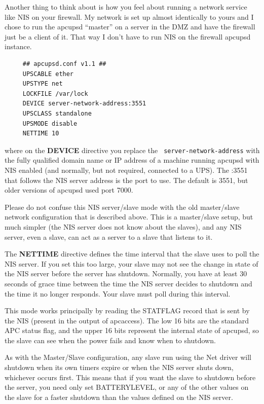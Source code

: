 {Another thing to think about is how you feel about running a network service
like NIS on your firewall. My network is set up almost identically to yours
and I chose to run the apcupsd ``master'' on a server in the DMZ and have the
firewall just be a client of it. That way I don't have to run NIS on the
firewall apcupsd instance. 

\footnotesize
\begin{verbatim}
     ## apcupsd.conf v1.1 ##
     UPSCABLE ether
     UPSTYPE net
     LOCKFILE /var/lock
     DEVICE server-network-address:3551
     UPSCLASS standalone
     UPSMODE disable
     NETTIME 10
\end{verbatim}
\normalsize

where on the {\bf DEVICE} directive you replace the {\tt
server-network-address} with the fully qualified domain name or IP address of
a machine running apcupsd with NIS enabled (and normally, but not required,
connected to a UPS). The :3551 that follows the NIS server address is the port
to use. The default is 3551, but older versions of apcupsd used port 7000.  

Please do not confuse this NIS server/slave mode with the old master/slave
network configuration that is described above.  This is a master/slave setup,
but much simpler (the NIS server does not know about the slaves), and any NIS
server, even a slave, can act as a server to a slave that listens to it.  

The {\bf NETTIME} directive defines the time interval that the slave uses to
poll the NIS server. If you set this too large, your slave may not see the
change in state of the NIS server before the server has shutdown. Normally,
you have at least 30 seconds of grace time between the time the NIS server
decides to shutdown and the time it no longer responds. Your slave must poll
during this interval.  

This mode works principally by reading the STATFLAG record that is sent by the
NIS (present in the output of apcaccess). The low 16 bits are the standard APC
status flag, and the upper 16 bits represent the internal state of apcupsd, so
the slave can see when the power fails and know when to shutdown.  

As with the Master/Slave configuration, any slave run using the Net driver
will shutdown when its own timers expire or when the NIS server shuts down,
whichever occurs first. This means that if you want the slave to shutdown
before the server, you need only set BATTERYLEVEL, or any of the other values
on the slave for a faster shutdown than the values defined on the NIS server. 

}
